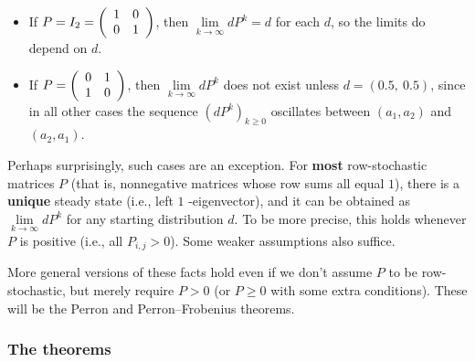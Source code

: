 \documentclass[numbers=enddot,12pt,final,onecolumn,notitlepage]{scrartcl}%
\numberwithin{exer}{subsection}
\theoremstyle{definition}
\begin{document}
\begin{itemize}
\item If $P=I_{2}=\left(
\begin{array}
[c]{cc}%
1 & 0\\
0 & 1
\end{array}
\right)  $, then $\lim\limits_{k\rightarrow\infty}dP^{k}=d$ for each $d$, so
the limits do depend on $d$.

\item If $P=\left(
\begin{array}
[c]{cc}%
0 & 1\\
1 & 0
\end{array}
\right)  $, then $\lim\limits_{k\rightarrow\infty}dP^{k}$ does not exist
unless $d=\left(  0.5,\ 0.5\right)  $, since in all other cases the sequence
$\left(  dP^{k}\right)  _{k\geq0}$ oscillates between $\left(  a_{1}%
,a_{2}\right)  $ and $\left(  a_{2},a_{1}\right)  $.
\end{itemize}

Perhaps surprisingly, such cases are an exception. For \textbf{most}
row-stochastic matrices $P$ (that is, nonnegative matrices whose row sums all
equal $1$), there is a \textbf{unique} steady state (i.e., left $1$%
-eigenvector), and it can be obtained as $\lim\limits_{k\rightarrow\infty
}dP^{k}$ for any starting distribution $d$. To be more precise, this holds
whenever $P$ is positive (i.e., all $P_{i,j}>0$). Some weaker assumptions also suffice.

More general versions of these facts hold even if we don't assume $P$ to be
row-stochastic, but merely require $P>0$ (or $P\geq0$ with some extra
conditions). These will be the Perron and Perron--Frobenius theorems.

\subsubsection{The theorems}
\end{document}
